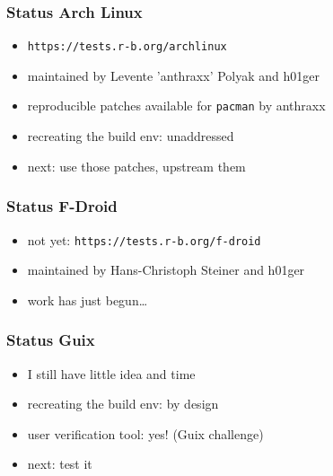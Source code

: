 \documentclass[14pt,aspectratio=169]{beamer}
\begin{document}
\begin{frame}
 \frametitle{Status Arch Linux}
 \begin{itemize}
  \item \texttt{https://tests.r-b.org/archlinux}
  \item maintained by Levente 'anthraxx' Polyak and h01ger
  \item reproducible patches available for \texttt{pacman} by anthraxx
  \item recreating the build env: unaddressed
  \item next: use those patches, upstream them
 \end{itemize}
\end{frame}

\begin{frame}
 \frametitle{Status F-Droid}
 \begin{itemize}
  \item not yet: \texttt{https://tests.r-b.org/f-droid}
  \item maintained by Hans-Christoph Steiner and h01ger
  \item work has just begun…
 \end{itemize}
\end{frame}

\begin{frame}
 \frametitle{Status Guix}
 \begin{itemize}
  \item I still have little idea and time
  \item recreating the build env: by design
  \item user verification tool: yes! (Guix challenge)
  \item<2> next: test it
 \end{itemize}
\end{frame}
\end{document}
